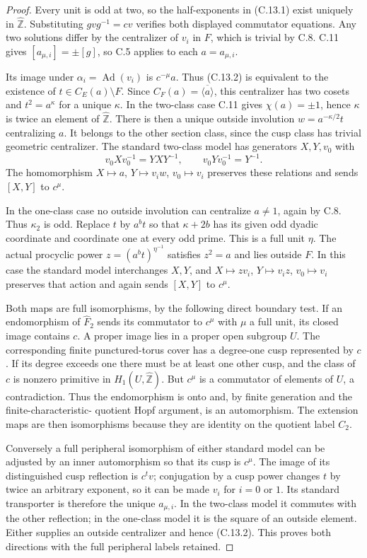 \begin{proof}
Every unit is odd at two, so the half-exponents
in (C.13.1) exist uniquely in
$\widehat{\mathbb Z}$.  Substituting
$gvg^{-1}=cv$ verifies both displayed
commutator equations.  Any two solutions
differ by the centralizer of $v_i$ in $F$,
which is trivial by C.8.  C.11 gives
$[a_{\mu,i}]=\pm[g]$, so C.5 applies to
each $a=a_{\mu,i}$.

Its image under $\alpha_i=\operatorname{Ad}(v_i)$
is $c^{-\mu}a$.  Thus (C.13.2) is equivalent
to the existence of $t\in C_E(a)\setminus F$.
Since $C_F(a)=\overline{\langle a\rangle}$,
this centralizer has two cosets and
$t^2=a^\kappa$ for a unique $\kappa$.
In the two-class case C.11 gives
$\chi(a)=\pm1$, hence $\kappa$ is twice
an element of $\widehat{\mathbb Z}$.
There is then a unique outside involution
$w=a^{-\kappa/2}t$ centralizing $a$.
It belongs to the other section class,
since the cusp class has trivial geometric
centralizer.  The standard two-class model
has generators $X,Y,v_0$ with
\[
 v_0Xv_0^{-1}=YXY^{-1},\qquad v_0Yv_0^{-1}=Y^{-1}.
\]
The homomorphism $X\mapsto a$, $Y\mapsto v_iw$,
$v_0\mapsto v_i$ preserves these relations
and sends $[X,Y]$ to $c^\mu$.

In the one-class case no outside involution
can centralize $a\ne1$, again by C.8.
Thus $\kappa_2$ is odd.  Replace $t$ by
$a^bt$ so that $\kappa+2b$ has its given
odd dyadic coordinate and coordinate one
at every odd prime.  This is a full unit
$\eta$.  The actual procyclic power
$z=(a^bt)^{\eta^{-1}}$ satisfies $z^2=a$
and lies outside $F$.  In this case the
standard model interchanges $X,Y$, and
$X\mapsto zv_i$, $Y\mapsto v_iz$,
$v_0\mapsto v_i$ preserves that action
and again sends $[X,Y]$ to $c^\mu$.

Both maps are full isomorphisms, by the
following direct boundary test.  If an
endomorphism of $\widehat F_2$ sends its
commutator to $c^\mu$ with $\mu$ a full
unit, its closed image contains $c$.
A proper image lies in a proper open
subgroup $U$.  The corresponding finite
punctured-torus cover has a degree-one
cusp represented by $c$.  If its degree
exceeds one there must be at least one
other cusp, and the class of $c$ is
nonzero primitive in $H_1(U,\widehat{\mathbb Z})$.
But $c^\mu$ is a commutator of elements
of $U$, a contradiction.  Thus the
endomorphism is onto and, by finite
generation and the finite-characteristic-
quotient Hopf argument, is an automorphism.
The extension maps are then isomorphisms
because they are identity on the quotient
label $C_2$.

Conversely a full peripheral isomorphism
of either standard model can be adjusted
by an inner automorphism so that its cusp
is $c^\mu$.  The image of its distinguished
cusp reflection is $c^t v$; conjugation
by a cusp power changes $t$ by twice an
arbitrary exponent, so it can be made
$v_i$ for $i=0$ or $1$.  Its standard
transporter is therefore the unique
$a_{\mu,i}$.  In the two-class model it
commutes with the other reflection; in
the one-class model it is the square of
an outside element.  Either supplies
an outside centralizer and hence (C.13.2).
This proves both directions with the
full peripheral labels retained.
\end{proof}

